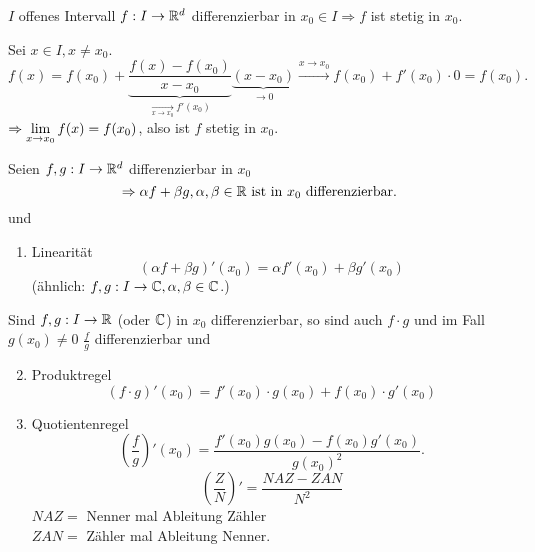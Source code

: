 \documentclass[../ana1.tex]{subfiles}
\begin{document}
\begin{satz}
    \( I \) offenes Intervall \( f : I \rightarrow \mathbb{R}^d \) 
    differenzierbar in \( x_0 \in I \Rightarrow f \) ist stetig 
    in \(x_0\).
\end{satz}
\begin{bew}
    Sei \( x\in I, x \neq x_0 \).
    \[ f(x) = f(x_0) + \underbrace{
    \frac{f(x) - f(x_0)}{x - x_0} }_{
        \underset{x\rightarrow x_0}{\longrightarrow} f'(x_0)
    } \underbrace{(x-x_0)}_{\rightarrow 0} 
    \overset{x\rightarrow x_0 }{\longrightarrow} 
    f(x_0) + f'(x_0) \cdot 0 = f(x_0). \]
    \( \Rightarrow \lim\limits_{x\rightarrow x_0} f(x) = f(x_0) \), also ist
    \( f \) stetig in \( x_0 \).
\end{bew}
\begin{satz}[Differentiationsregeln]\label{satz:diff_regeln}
    Seien \( f, g: I \rightarrow \mathbb{R}^d \) differenzierbar in \(x_0\)
    \[ \Rightarrow \alpha f + \beta g, \alpha, \beta \in \mathbb{R} 
    \text{ ist in } x_0 \text{ differenzierbar.} \]
    und 
    \begin{enumerate}
        \item Linearität 
        \[ (\alpha f + \beta g)'(x_0) = \alpha f'(x_0) 
        + \beta g'(x_0) \]
        (ähnlich: \( f, g: I \rightarrow \mathbb{C}, \alpha, \beta \in \mathbb{C} \).)
    \end{enumerate}
    Sind \( f, g: I \rightarrow \mathbb{R} \) (oder \( \mathbb{C} \)) in \(x_0\)
    differenzierbar, so sind auch \( f\cdot g \) und im Fall 
    \( g(x_0) \neq 0 \) \( \frac{f}{g} \) differenzierbar und 
    \begin{enumerate}
        \setcounter{enumi}{1}
        \item Produktregel
        \[ (f \cdot g)'(x_0) = f'(x_0) \cdot g(x_0) 
        + f(x_0) \cdot g'(x_0) \]
        \item Quotientenregel
        \[ \left( \frac{f}{g} \right)'(x_0) 
        = \frac{ f'(x_0) g(x_0) - f(x_0) g'(x_0) }{ {g(x_0)}^2 }. \]
        \[ \left(\frac{Z}{N}\right)' = \frac{NAZ - ZAN}{N^2} \]
        \( NAZ = \) Nenner mal Ableitung Zähler\\
        \( ZAN = \) Zähler mal Ableitung Nenner.
    \end{enumerate}
\end{satz}
\end{document}
